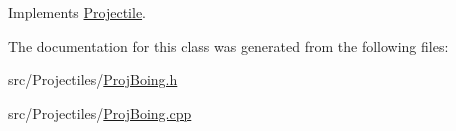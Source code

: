 Implements \mbox{\hyperlink{class_projectile_ad8fae955389ff8944830e9d80e0f1ce1}{Projectile}}.



The documentation for this class was generated from the following files\+:\begin{DoxyCompactItemize}
\item 
src/\+Projectiles/\mbox{\hyperlink{_proj_boing_8h}{Proj\+Boing.\+h}}\item 
src/\+Projectiles/\mbox{\hyperlink{_proj_boing_8cpp}{Proj\+Boing.\+cpp}}\end{DoxyCompactItemize}
